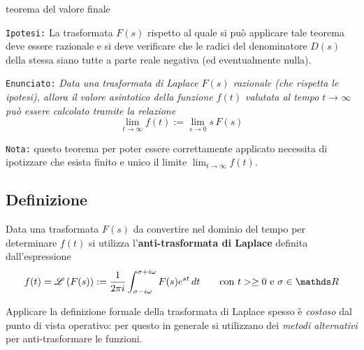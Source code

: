 		\begin{teorema}{teorema del valore finale}
		
			\texttt{Ipotesi:}  \label{teor:valfinale} La trasformata $F(s)$ rispetto al quale si può applicare tale teorema deve essere razionale e si deve verificare che le radici del denominatore $D(s)$ della stessa siano tutte a parte reale negativa (ed eventualmente nulla). \vspace{3mm}
			
			\texttt{Enunciato:} \textit{Data una trasformata di Laplace $F(s)$ razionale (che rispetta le ipotesi), allora il valore asintotico della funzione $f(t)$ valutata al tempo $t\rightarrow \infty$ può essere calcolato tramite la relazione}
			\begin{equation}
				\lim_{t\rightarrow \infty}f(t) := \lim_{s\rightarrow 0} s\,F(s)
			\end{equation}
			
			\vspace{3mm}
			\texttt{Nota:} questo teorema per poter essere correttamente applicato necessita di ipotizzare che esista finito e unico il limite $\lim_{t\rightarrow \infty}f(t)$.
		
		\end{teorema}
	
	\subsection{Definizione}
		\begin{concetto}
			Data una trasformata $F(s)$ da convertire nel dominio del tempo per determinare $f(t)$ si utilizza l'\textbf{anti-trasformata di Laplace} definita dall'espressione
			\begin{equation}
				f(t) = \trasf{F(s)} := \frac{1}{2\pi i} \int_{\sigma-i\omega}^{\sigma+i\omega} F(s) e^{st} \, dt \qquad \textrm{con $t>\geq 0$ e } \sigma \in \mathds R
			\end{equation}
		\end{concetto}
		Applicare la definizione formale della trasformata di Laplace spesso è \textit{costoso} dal punto di vista operativo: per questo in generale si utilizzano dei \textit{metodi alternativi} per anti-trasformare le funzioni.
		

